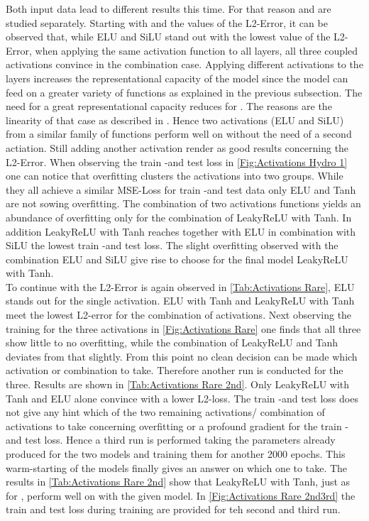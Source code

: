 Both input data lead to different results this time. For that reason \hy and \rare are studied separately. Starting with \hy and the values of the L2-Error, it can be observed that,
while ELU and SiLU stand out with the lowest value of the L2-Error, when applying the same activation function to all layers, all three coupled activations convince in the combination case. Applying different activations to the layers increases the representational capacity of the model since the model can feed on a greater variety of functions as explained in the previous subsection. The need for a great representational capacity reduces for \hy. The reasons are the linearity of that case as described in \cite{BGK}. Hence two activations (ELU and SiLU) from a similar family of functions perform well on \hy without the need of a second actiation. Still adding another activation render as good results concerning the L2-Error. When observing the train -and test loss in \cref{Fig:Activations Hydro 1} one can notice that overfitting clusters the activations into two groups. While they all achieve a similar MSE-Loss for train -and test data only ELU and Tanh are not sowing overfitting. The combination of two activations functions yields an abundance of overfitting only for the combination of LeakyReLU with Tanh. In addition LeakyReLU with Tanh reaches together with ELU in combination with SiLU the lowest train -and test loss. The slight overfitting observed with the combination ELU and SiLU  give rise to choose for the final model LeakyReLU with Tanh.\\
To continue with \rare  the L2-Error is again observed in \cref{Tab:Activations Rare}, ELU stands out for the single activation. ELU with Tanh and LeakyReLU with Tanh meet the lowest L2-error for the combination of activations. Next observing the training for the three activations in \cref{Fig:Activations Rare} one finds that all three show little to no overfitting, while the combination of LeakyReLU and Tanh deviates from that slightly. From this point no clean decision can be made which activation or combination to take. Therefore another run is conducted for the three. Results are shown in \cref{Tab:Activations Rare 2nd}. Only LeakyReLU with Tanh and ELU alone convince with a lower L2-loss. The train -and test loss does not give any hint which of the two remaining activations/ combination of activations to take concerning overfitting or a profound gradient for the train -and test loss. Hence a third run is performed taking the parameters already produced for the two models and training them for another 2000 epochs. This warm-starting of the models finally gives an answer on which one to take. The results in \cref{Tab:Activations Rare 2nd} show that LeakyReLU with Tanh, just as for \hy, perform well on \rare with the given model. In \cref{Fig:Activations Rare 2nd3rd} the train and test loss during training are provided for teh second and third run. 
